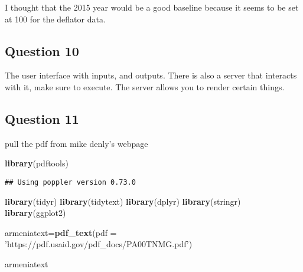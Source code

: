 \documentclass[
]{article}
\newenvironment{Shaded}{\begin{snugshade}}{\end{snugshade}}
\newcommand{\DataTypeTok}[1]{\textcolor[rgb]{0.13,0.29,0.53}{#1}}
\newcommand{\KeywordTok}[1]{\textcolor[rgb]{0.13,0.29,0.53}{\textbf{#1}}}
\newcommand{\NormalTok}[1]{#1}
\newcommand{\StringTok}[1]{\textcolor[rgb]{0.31,0.60,0.02}{#1}}
\begin{document}
I thought that the 2015 year would be a good baseline because it seems
to be set at 100 for the deflator data.

\hypertarget{question-10}{%
\subsection{Question 10}\label{question-10}}

The user interface with inputs, and outputs. There is also a server that
interacts with it, make sure to execute. The server allows you to render
certain things.

\hypertarget{question-11}{%
\subsection{Question 11}\label{question-11}}

pull the pdf from mike denly's webpage

\begin{Shaded}
\begin{Highlighting}[]
\KeywordTok{library}\NormalTok{(pdftools)}
\end{Highlighting}
\end{Shaded}

\begin{verbatim}
## Using poppler version 0.73.0
\end{verbatim}

\begin{Shaded}
\begin{Highlighting}[]
\KeywordTok{library}\NormalTok{(tidyr)}
\KeywordTok{library}\NormalTok{(tidytext)}
\KeywordTok{library}\NormalTok{(dplyr)}
\KeywordTok{library}\NormalTok{(stringr)}
\KeywordTok{library}\NormalTok{(ggplot2)}

\NormalTok{armeniatext=}\KeywordTok{pdf_text}\NormalTok{(}\DataTypeTok{pdf =} \StringTok{'https://pdf.usaid.gov/pdf_docs/PA00TNMG.pdf'}\NormalTok{)}

\NormalTok{armeniatext}
\end{Highlighting}
\end{Shaded}
\end{document}
